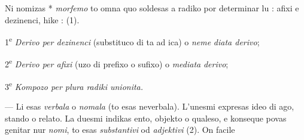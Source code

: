 \begin{VUpage}[121]{}
Ni nomizas * \textit{morfemo} to omna quo soldesas a radiko\nl
por determinar lu : afixi e dezinenci, hike :  (1).

\VUsaut{5.54mm}
\VUsaut{4.19mm}

1\textsuperscript{e} \textit{Derivo per dezinenci} (substituco di ta ad ica) o \textit{neme}\cc
\textit{diata derivo};

2\textsuperscript{e} \textit{Derivo per afixi} (uzo di prefixo o sufixo) o \textit{mediata}\nl
\textit{derivo};

3\textsuperscript{e} \textit{Kompozo per plura radiki unionita.}

 --- Li esas \textit{verbala} o \textit{nomala} (to esas neverbala).\nl
L'unesmi expresas ideo di ago, stando o relato. La duesmi\nl
indikas ento, objekto o qualeso, e konseque povas genitar\nl
nur \textit{nomi}, to esas \textit{substantivi} od \textit{adjektivi} (2). On facile\parplein
\end{VUpage}


